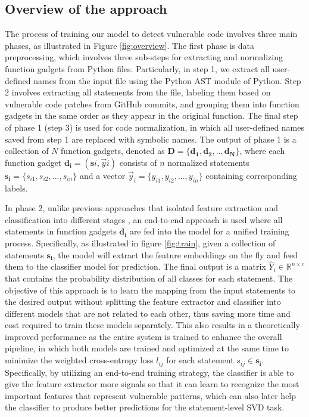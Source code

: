 \documentclass{ieeeaccess}
\begin{document}
\subsection{Overview of the approach} \label{sec:Overview}

\par The process of training our model to detect vulnerable code involves three main phases, as illustrated in Figure \ref{fig:overview}. The first phase is data preprocessing, which involves three sub-steps for extracting and normalizing function gadgets from Python files. Particularly, in step 1, we extract all user-defined names from the input file using the Python AST module of Python. Step 2 involves extracting all statements from the file, labeling them based on vulnerable code patches from GitHub commits, and grouping them into function gadgets in the same order as they appear in the original function. The final step of phase 1 (step 3) is used for code normalization, in which all user-defined names saved from step 1 are replaced with symbolic names. The output of phase 1 is a collection of $N$ function gadgets, denoted as $\mathbf{D}=\{\mathbf{d_1, d_2, .., d_N}\}$, where each function gadget $\mathbf{d_i}=(\mathbf{s}i, \Vec{y}i)$ consists of $n$ normalized statements $\mathbf{s_i}=\{s_{i1}, s_{i2},..., s_{in}\}$ and a vector $\Vec{y}_i=\{y_{i1},y_{i2},...,y_{in}\}$ containing corresponding labels.
\par In phase 2, unlike previous approaches that isolated feature extraction and classification into different stages \cite{VUDENC, vuldeekeeper, vuldeepeeker2}, an end-to-end approach is used where all statements in function gadgets $\mathbf{d_i}$ are fed into the model for a unified training  process. Specifically, as illustrated in figure \ref{fig:train},  given a collection of statements $\mathbf{s_i}$, the model will extract the feature embeddings on the fly and feed them to the classifier model for prediction. The final output  is a matrix $\hat{Y}_i \in \mathbb{R}^{n \times c}$ that contains the probability distribution of all classes for each statement. The objective of this approach is to learn the mapping from the input statements to the desired output without splitting the feature extractor and classifier into different models that are not related to each other, thus saving more time and cost required to train these models separately. This also results in a theoretically improved performance as the entire system is trained to enhance the overall pipeline,  in which both models are trained and optimized at the same time to minimize the weighted cross-entropy loss $l_{ij}$ for each statement $s_{ij} \in \mathbf{s_i}$. Specifically, by utilizing an end-to-end training strategy, the classifier is able to give the feature extractor more signals so that it can learn to recognize the most important features that represent vulnerable patterns, which can also later help the classifier to produce better predictions for the statement-level SVD task. 
\end{document}
